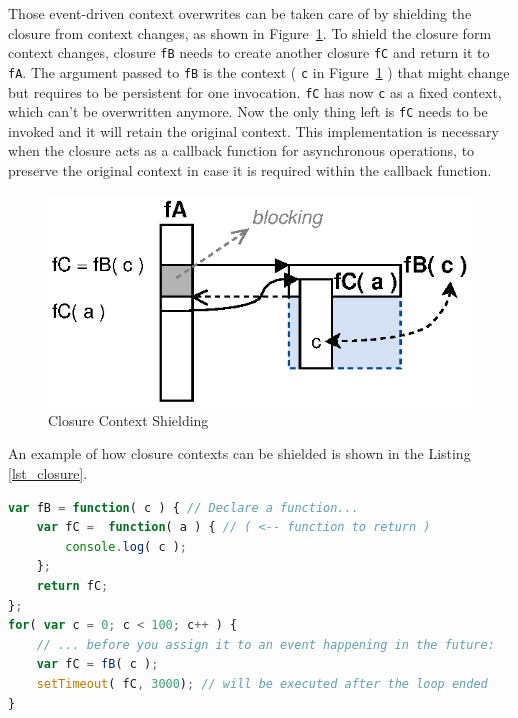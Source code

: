 Those event-driven context overwrites can be taken care of by shielding the closure from context changes, as shown in Figure~\ref{fig:Closures_Closure-3}.
To shield the closure form context changes, closure \texttt{fB} needs to create another closure \texttt{fC} and return it to \texttt{fA}.
The argument passed to \texttt{fB} is the context ( \texttt{c} in Figure~\ref{fig:Closures_Closure-3} ) that might change but requires to be persistent for one invocation.
\texttt{fC} has now \texttt{c} as a fixed context, which can't be overwritten anymore.
Now the only thing left is \texttt{fC} needs to be invoked and it will retain the original context.
This implementation is necessary when the closure acts as a callback function for asynchronous operations, to preserve the original context in case it is required within the callback function.
\begin{figure}[!ht]
	\centering
  \includegraphics{figures/Closures_Closure-3}
	\caption{Closure Context Shielding}
	\label{fig:Closures_Closure-3}
\end{figure}

An example of how closure contexts can be shielded is shown in the Listing \ref{lst_closure}.
\begin{lstlisting}[float=h,label=lst_closure,language=JavaScript,caption=JavaScript Context Shielding]
var fB = function( c ) { // Declare a function...
	var fC =  function( a ) { // ( <-- function to return )
		console.log( c );
	};
	return fC;
};
for( var c = 0; c < 100; c++ ) {
	// ... before you assign it to an event happening in the future:
	var fC = fB( c );
	setTimeout( fC, 3000); // will be executed after the loop ended
}
\end{lstlisting}





